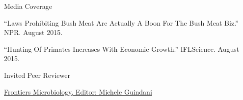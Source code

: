 \begin{cventries}
\vspace{.5cm}
\cventry
    {}
    {Media Coverage}
    {}
    {}
    {
     \begin{cvitems} %
        \item{``Laws Prohibiting Bush Meat Are Actually A Boon For The Bush Meat Biz.'' NPR. August 2015.}
        \item{``Hunting Of Primates Increases With Economic Growth.'' IFLScience. August 2015.}
      \end{cvitems}
    }
    
\vspace{.5cm}
\cventry
    {}
    {Invited Peer Reviewer}
    {}
    {}
    {
     \begin{cvitems} %
        \item{\href{https://doi.org/10.3389/fmicb.2018.00297}{Frontiers Microbiology, Editor: Michele Guindani}}
      \end{cvitems}
    }
\end{cventries}


